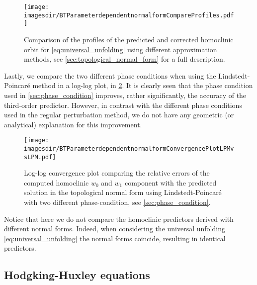 \begin{figure}[!ht]
\centering
\texttt{[image: \\imagesdir/BTParameterdependentnormalformCompareProfiles.pdf]}
\caption{Comparison of the profiles of the predicted and corrected
    homoclinic orbit for \cref{eq:universal_unfolding} using different
    approximation methods, see
\cref{sec:topological_normal_form} for a full description.}
\label{fig:RP_vs_LP2016_vs_LP_profiles}
\end{figure}

Lastly, we compare the two different phase conditions when using the
Lindstedt-Poincar\'e method in a log-log plot, in \cref{fig:LPM_vs_LPM}. It is
clearly seen that the phase condition used in \cref{sec:phase_condition}
improves, rather significantly, the accuracy of the third-order predictor.
However, in contrast with the different phase conditions used in the regular
perturbation method, we do not have any geometric (or analytical) explanation
for this improvement.

\begin{figure}
    \texttt{[image: \\imagesdir/BTParameterdependentnormalformConvergencePlotLPMvsLPM.pdf]}
    \label{fig:LPM_vs_LPM}
    \caption{
        Log-log convergence plot comparing the relative errors of the computed
        homoclinic $w_0$ and $w_1$ component with the predicted solution in the
        topological normal form using Lindstedt-Poincar\'e with two different
        phase-condition, see \cref{sec:phase_condition}.}
\end{figure}
Notice that here we do not compare the homoclinic predictors derived with
different normal forms. Indeed, when considering the universal unfolding
\cref{eq:universal_unfolding} the normal forms coincide, resulting in identical
predictors.


\ifthesis
\subsection{Hodgking-Huxley equations}

